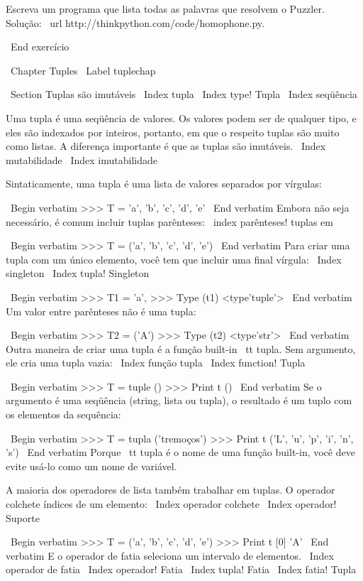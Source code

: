 \documentclass[10pt]{book}
\begin{document}
{{{{{{{Escreva um programa que lista todas as palavras que resolvem o Puzzler.
Solução: \ url {http://thinkpython.com/code/homophone.py}.

\ End {} exercício



\ Chapter {} Tuples
\ Label {} tuplechap

\ Section {Tuplas são imutáveis}
\ Index {} tupla
\ Index {type! Tupla}
\ Index {seqüência}

Uma tupla é uma seqüência de valores. Os valores podem ser de qualquer tipo, e
eles são indexados por inteiros, portanto, em que o respeito tuplas são muito
como listas. A diferença importante é que as tuplas são imutáveis.
\ Index {} mutabilidade
\ Index {imutabilidade}

Sintaticamente, uma tupla é uma lista de valores separados por vírgulas:

\ Begin {verbatim}
>>> T = 'a', 'b', 'c', 'd', 'e'
\ End {verbatim}
%
Embora não seja necessário, é comum incluir tuplas
parênteses:
\ index {parênteses! tuplas em}

\ Begin {verbatim}
>>> T = ('a', 'b', 'c', 'd', 'e')
\ End {verbatim}
%
Para criar uma tupla com um único elemento, você tem que incluir uma final
vírgula:
\ Index {singleton}
\ Index {tupla! Singleton}

\ Begin {verbatim}
>>> T1 = 'a',
>>> Type (t1)
<type'tuple'>
\ End {verbatim}
%
Um valor entre parênteses não é uma tupla:

\ Begin {verbatim}
>>> T2 = ('A')
>>> Type (t2)
<type'str'>
\ End {verbatim}
%
Outra maneira de criar uma tupla é a função built-in {\ tt tupla}.
Sem argumento, ele cria uma tupla vazia:
\ Index {função tupla}
\ Index {function! Tupla}

\ Begin {verbatim}
>>> T = tuple ()
>>> Print t
()
\ End {verbatim}
%
Se o argumento é uma seqüência (string, lista ou tupla), o resultado
é um tuplo com os elementos da sequência:

\ Begin {verbatim}
>>> T = tupla ('tremoços')
>>> Print t
('L', 'u', 'p', 'i', 'n', 's')
\ End {verbatim}
%
Porque {\ tt tupla} é o nome de uma função built-in, você deve
evite usá-lo como um nome de variável.

A maioria dos operadores de lista também trabalhar em tuplas. O operador colchete
índices de um elemento:
\ Index {operador colchete}
\ Index {operador! Suporte}

\ Begin {verbatim}
>>> T = ('a', 'b', 'c', 'd', 'e')
>>> Print t [0]
'A'
\ End {verbatim}
%
E o operador de fatia seleciona um intervalo de elementos.
\ Index {operador de fatia}
\ Index {operador! Fatia}
\ Index {tupla! Fatia}
\ Index {fatia! Tupla}

}}}}}}}
\end{document}
